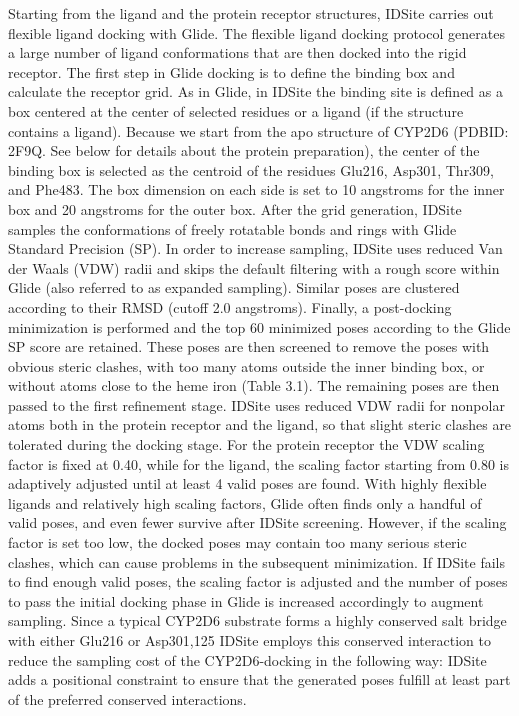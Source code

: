 Starting from the ligand and the protein receptor structures, IDSite carries out flexible ligand docking with Glide.
The flexible ligand docking protocol generates a large number of ligand conformations that are then docked into the rigid receptor.
The first step in Glide docking is to define the binding box and calculate the receptor grid.
As in Glide, in IDSite the binding site is defined as a box centered at the center of selected residues or a ligand (if the structure contains a ligand).
Because we start from the apo structure of CYP2D6 (PDBID: 2F9Q.
See below for details about the protein preparation), the center of the binding box is selected as the centroid of the residues Glu216, Asp301, Thr309, and Phe483.
The box dimension on each side is set to 10 angstroms for the inner box and 20 angstroms for the outer box.
After the grid generation, IDSite samples the conformations of freely rotatable bonds and rings with Glide Standard Precision (SP).
In order to increase sampling, IDSite uses reduced Van der Waals (VDW) radii and skips the default filtering with a rough score within Glide (also referred to as expanded sampling).
Similar poses are clustered according to their RMSD (cutoff 2.0 angstroms).
Finally, a post-docking minimization is performed and the top 60 minimized poses according to the Glide SP score are retained.
These poses are then screened to remove the poses with obvious steric clashes, with too many atoms outside the inner binding box, or without atoms close to the heme iron (Table 3.1).
The remaining poses are then passed to the first refinement stage.
IDSite uses reduced VDW radii for nonpolar atoms both in the protein receptor and the ligand, so that slight steric clashes are tolerated during the docking stage.
For the protein receptor the VDW scaling factor is fixed at 0.40, while for the ligand, the scaling factor starting from 0.80 is adaptively adjusted until at least 4 valid poses are found.
With highly flexible ligands and relatively high scaling factors, Glide often finds only a handful of valid poses, and even fewer survive after IDSite screening.
However, if the scaling factor is set too low, the docked poses may contain too many serious steric clashes, which can cause problems in the subsequent minimization.
If IDSite fails to find enough valid poses, the scaling factor is adjusted and the number of poses to pass the initial docking phase in Glide is increased accordingly to augment sampling.
Since a typical CYP2D6 substrate forms a highly conserved salt bridge with either Glu216 or Asp301,125 IDSite employs this conserved interaction to reduce the sampling cost of the CYP2D6-docking in the following way: IDSite adds a positional constraint to ensure that the generated poses fulfill at least part of the preferred conserved interactions.
